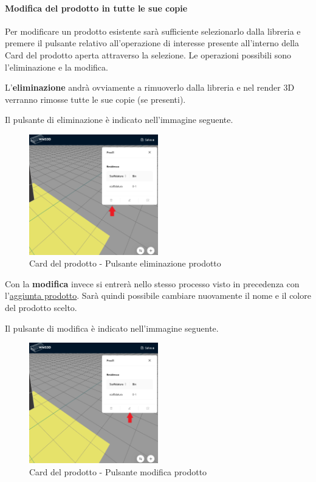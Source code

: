         \paragraph{Modifica del prodotto in tutte le sue copie}
        Per modificare un prodotto esistente sarà sufficiente selezionarlo dalla libreria e premere il pulsante relativo all'operazione di interesse presente 
        all'interno della Card del prodotto aperta attraverso la selezione. Le operazioni possibili sono l'eliminazione e la modifica.  

        \bigskip
        L'\textbf{eliminazione} andrà ovviamente a rimuoverlo dalla libreria e nel render 3D verranno rimosse tutte le sue copie (se presenti).
        
        \noindent Il pulsante di eliminazione è indicato nell'immagine seguente.
        \begin{figure}[H]
            \centering
            \includegraphics[width=0.5\textwidth]{images/pulsante_elimina_prod.png}
            \caption{Card del prodotto - Pulsante eliminazione prodotto}
        \end{figure}
        
        Con la \textbf{modifica} invece si entrerà nello stesso processo visto in precedenza con l'\hyperref[sec:prodotti:aggiunta]{aggiunta prodotto}. 
        Sarà quindi possibile cambiare nuovamente il nome e il colore del prodotto scelto. 
        
        \noindent Il pulsante di modifica è indicato nell'immagine seguente.
        \begin{figure}[H]
            \centering
            \includegraphics[width=0.5\textwidth]{images/pulsante_modifica_prod.png}
            \caption{Card del prodotto - Pulsante modifica prodotto}
        \end{figure}

